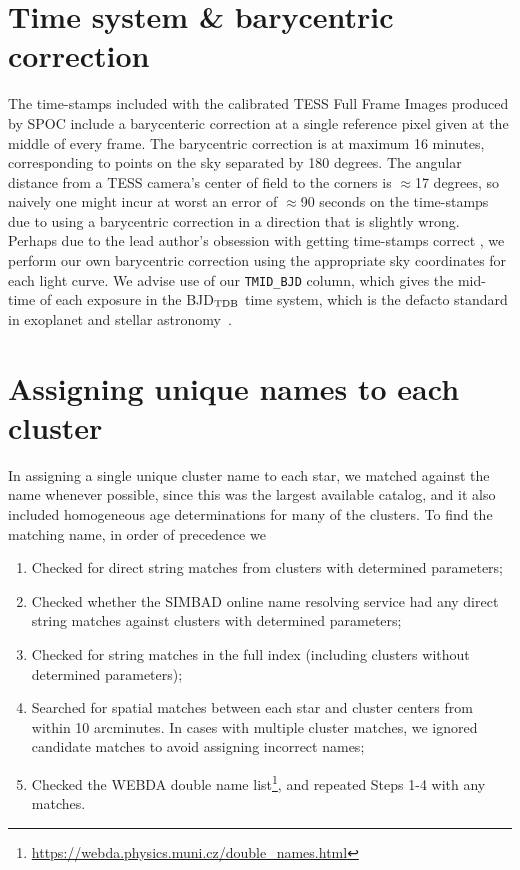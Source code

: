 \documentclass[12pt,twocolumn,tighten]{aastex62}
\begin{document}
\appendix
\section{Time system \& barycentric correction}
\label{appendix:time}

The time-stamps included with the calibrated TESS Full Frame Images
produced by SPOC include a barycenteric correction at
a single reference pixel given at the middle of every frame.
The barycentric correction is at maximum 16 minutes, corresponding to
points on the sky separated by 180 degrees.
The angular distance from a TESS camera's center of field to the corners
is $\approx$17 degrees, so naively one might incur at worst an error of
$\approx$90 seconds on the time-stamps due to using a barycentric
correction in a direction that is slightly wrong.
Perhaps due to the lead author's obsession with getting time-stamps correct 
\citep{bouma_wasp-4b_2019},
we perform our own barycentric correction using the appropriate
sky coordinates for each light curve.
We advise use of our \texttt{TMID\_BJD} column, which gives the
mid-time of each exposure in the BJD$_{\rm TDB}$ time system, which
is the defacto standard in exoplanet and stellar
astronomy~\citep{eastman_achieving_2010}.

\section{Assigning unique names to each cluster}
\label{appendix:uniquenames}

In assigning a single unique cluster name to each star, we matched
against the \citet{Kharchenko_et_al_2013} name whenever possible,
since this was the largest available catalog, and it also included
homogeneous age determinations for many of the clusters.
To find the matching name, in order of precedence we
\begin{enumerate}
  \item Checked for direct string matches from
    \citet{Kharchenko_et_al_2013} clusters with determined parameters;
  \item Checked whether the SIMBAD online name resolving service \citep{wenger_simbad_2000} had
    any direct string matches against \citet{Kharchenko_et_al_2013}
    clusters with determined parameters;
  \item Checked for string matches in the full
    \citet{Kharchenko_et_al_2013} index (including clusters without
    determined parameters);
  \item Searched for spatial matches between each star and cluster
    centers from \citet{Kharchenko_et_al_2013} within 10 arcminutes.
    In cases with multiple cluster matches, we ignored candidate
    matches to avoid assigning incorrect names;
  \item Checked the WEBDA double name
    list\footnote{\url{https://webda.physics.muni.cz/double_names.html}},
    and repeated Steps 1-4 with any matches.
\end{enumerate}
\end{document}
